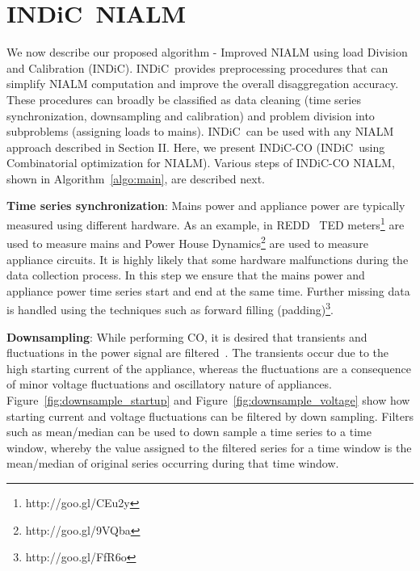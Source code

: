 \documentclass[conference]{IEEEtran}
\newcommand{\figref}[1]{Figure~\ref{#1}}
\newcommand{\algoref}[1]{Algorithm~\ref{#1}}
\newcommand{\indic}{INDiC~}
\newcommand{\indicns}{INDiC}
\begin{document}

\vspace{-2mm}
\section{\indic NIALM}
\vspace{-1mm}
\noindent We now describe our proposed algorithm - Improved NIALM using load Division and Calibration (\indicns). \indic provides preprocessing procedures that can simplify NIALM computation and improve the overall disaggregation accuracy. These procedures can broadly be classified as data cleaning (time series synchronization, downsampling and calibration) and problem division into subproblems (assigning loads to mains). \indic can be used with any NIALM approach described in Section II. Here, we present \indicns-CO (\indic using Combinatorial optimization for NIALM). %
Various steps of \indicns-CO NIALM, shown in \algoref{algo:main}, are described next. 

\noindent\textbf{Time series synchronization}: Mains power and appliance power are typically measured using different hardware. As an example, in REDD~\cite{redd} TED meters\footnote{http://goo.gl/CEu2y} are used to measure mains and Power House Dynamics\footnote{http://goo.gl/9VQba} are used to measure appliance circuits. It is highly likely that some hardware malfunctions during the data collection process. In this step we ensure that the mains power and appliance power time series start and end at the same time. Further missing data is handled using the techniques such as forward filling (padding)\footnote{http://goo.gl/FfR6o}.

\noindent\textbf{Downsampling}: While performing CO, it is desired that transients and fluctuations in the power signal are filtered~\cite{hart}. The transients occur due to the high starting current of the appliance, whereas the fluctuations are a consequence of minor voltage fluctuations and oscillatory nature of appliances. \figref{fig:downsample_startup} and \figref{fig:downsample_voltage} show how starting current and voltage fluctuations can be filtered by down sampling. Filters such as mean/median can be used to down sample a time series to a time window, whereby the value assigned to the filtered series for a time window is the mean/median of original series occurring during that time window. 
\end{document}
